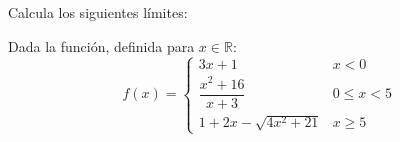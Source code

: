 \documentclass[addpoints,spanish, 12pt,a4paper]{exam}
\begin{document}
\begin{questions}

\question Calcula los siguientes límites:

\question[4] Dada la función, definida para $x \in \mathbb{R} $:
$$f(x)= \begin{cases} 3x+1 &  x < 0 \\ \dfrac{x^2+16}{x+3} & 0\leq x < 5 \\ 
1+2x-\sqrt{4x^2+21} & x \geq 5 \end{cases}$$
\begin{parts}


\end{parts}
\end{questions}
\end{document}
